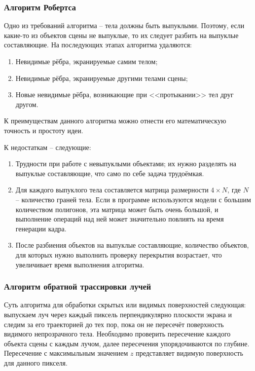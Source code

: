 \subsubsection{Алгоритм Робертса}

Одно из требований алгоритма -- тела должны быть выпуклыми. Поэтому, если
какие-то из объектов сцены не выпуклые, то их следует разбить на выпуклые
составляющие. На последующих этапах алгоритма удаляются:
\begin{enumerate}
    \item Невидимые рёбра, экранируемые самим телом;
    \item Невидимые рёбра, экранируемые другими телами сцены;
    \item Новые невидимые рёбра, возникающие при <<протыкании>> тел друг
        другом.
\end{enumerate}

К преимуществам данного алгоритма можно отнести его математическую точность и
простоту идеи. \cite[с.~250]{rogers}

К недостаткам -- следующие:\begin{enumerate}
    \item Трудности при работе с невыпуклыми объектами; их нужно разделять на
        выпуклые составляющие, что само по себе задача трудоёмкая.
    \item Для каждого выпуклого тела составляется матрица размерности $4 \times
        N$, где $N$ -- количество граней тела. Если в программе используются
        модели с большим количеством полигонов, эта матрица может быть очень
        большой, и выполнение операций над ней может значительно повлиять на
        время генерации кадра.
    \item После разбиения объектов на выпуклые составляющие, количество
        объектов, для которых нужно выполнить проверку перекрытия возрастает,
        что увеличивает время выполнения алгоритма.
\end{enumerate}

\subsubsection{Алгоритм обратной трассировки лучей}

Суть алгоритма для обработки скрытых или видимых поверхностей следующая:
выпускаем луч через каждый пиксель перпендикулярно плоскости экрана и следим за
его траекторией до тех пор, пока он не пересечёт поверхность видимого
непрозрачного тела. Необходимо проверить пересечение каждого объекта сцены с
каждым лучом, далее пересечения упорядочиваются по глубине. Пересечение с
максимыльным значением $z$ представляет видимую поверхность для данного
пикселя. \cite[с.~362]{rogers}


